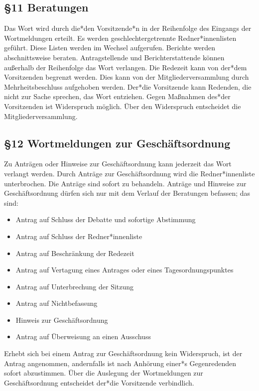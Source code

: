 \documentclass[12pt]{report}
\begin{document}
\begin{flushleft}
\subsection*{§11 Beratungen}
Das Wort wird durch die*den Vorsitzende*n in der Reihenfolge des Eingangs der Wortmeldungen erteilt.
Es werden geschlechtergetrennte Redner*innenlisten geführt. Diese Listen werden im Wechsel aufgerufen. Berichte werden
abschnittsweise beraten. Antragstellende und Berichterstattende können außerhalb der Reihenfolge das
Wort verlangen. Die Redezeit kann von der*dem Vorsitzenden begrenzt werden. Dies kann von der 
Mitgliederversammlung durch Mehrheitsbeschluss aufgehoben werden. Der*die Vorsitzende kann Redenden, die
nicht zur Sache sprechen, das Wort entziehen. Gegen Maßnahmen des*der Vorsitzenden ist Widerspruch
möglich. Über den Widerspruch entscheidet die Mitgliederversammlung.
\subsection*{§12 Wortmeldungen zur Geschäftsordnung}
Zu Anträgen oder Hinweise zur Geschäftsordnung kann jederzeit das Wort verlangt werden. Durch Anträge
zur Geschäftsordnung wird die Redner*innenliste unterbrochen. Die Anträge sind sofort zu behandeln. Anträge und
Hinweise zur Geschäftsordnung dürfen sich nur mit dem Verlauf der Beratungen befassen; das sind:

\begin{itemize}
  \item Antrag auf Schluss der Debatte und sofortige Abstimmung
  \item Antrag auf Schluss der Redner*innenliste
  \item Antrag auf Beschränkung der Redezeit
  \item Antrag auf Vertagung eines Antrages oder eines Tagesordnungspunktes
  \item Antrag auf Unterbrechung der Sitzung
  \item Antrag auf Nichtbefassung
  \item Hinweis zur Geschäftsordnung
  \item Antrag auf Überweisung an einen Ausschuss
\end{itemize}

Erhebt sich bei einem Antrag zur Geschäftsordnung kein Widerspruch, ist der Antrag angenommen,
andernfalls ist nach Anhörung einer*s Gegenredenden sofort abzustimmen. Über die Auslegung der Wortmeldungen
zur Geschäftsordnung entscheidet der*die Vorsitzende verbindlich.


\end{flushleft}
\end{document}

